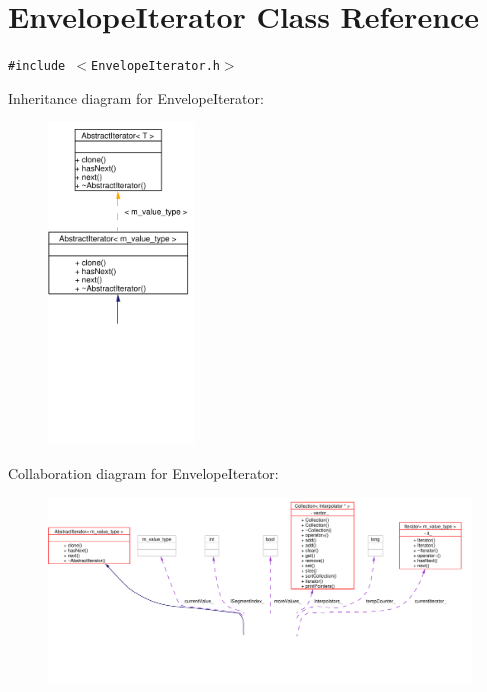 \hypertarget{classEnvelopeIterator}{
\section{Envelope\-Iterator Class Reference}
\label{classEnvelopeIterator}
}
{\tt \#include $<$Envelope\-Iterator.h$>$}

Inheritance diagram for Envelope\-Iterator:\begin{figure}[H]
\begin{center}
\leavevmode
\includegraphics[width=110pt]{classEnvelopeIterator__inherit__graph}
\end{center}
\end{figure}
Collaboration diagram for Envelope\-Iterator:\begin{figure}[H]
\begin{center}
\leavevmode
\includegraphics[width=420pt]{classEnvelopeIterator__coll__graph}
\end{center}
\end{figure}
